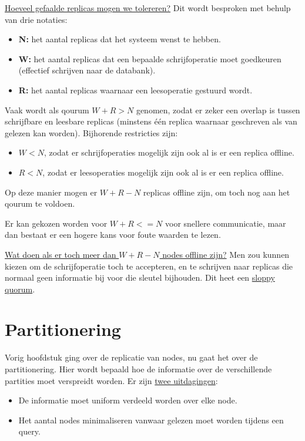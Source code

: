 	\underline{Hoeveel gefaalde replicas mogen we tolereren?} Dit wordt besproken met behulp van drie notaties:
	\begin{itemize}
		\item[\info] \textbf{N:} het aantal replicas dat het systeem wenst te hebben.
		\item[\info] \textbf{W:} het aantal replicas dat een bepaalde schrijfoperatie moet goedkeuren (effectief schrijven naar de databank).
		\item[\info] \textbf{R:} het aantal replicas waarnaar een leesoperatie gestuurd wordt.
	\end{itemize}

	Vaak wordt als qourum $W + R > N$ genomen, zodat er zeker een overlap is tussen schrijfbare en leesbare replicas (minstens één replica waarnaar geschreven als van gelezen kan worden). Bijhorende restricties zijn:
	\begin{itemize}
		\item[\info] $W < N$, zodat er schrijfoperaties mogelijk zijn ook al is er een replica offline.
		\item[\info] $R < N$, zodat er leesoperaties mogelijk zijn ook al is er een replica offline.
	\end{itemize}
	Op deze manier mogen er $W + R - N$ replicas offline zijn, om toch nog aan het qourum te voldoen.

	
	Er kan gekozen worden voor $W + R <= N$ voor snellere communicatie, maar dan bestaat er een hogere kans voor foute waarden te lezen. 

	\underline{Wat doen als er toch meer dan $W + R - N$ nodes offline zijn?} Men zou kunnen kiezen om de schrijfoperatie toch te accepteren, en te schrijven naar replicas die normaal geen informatie bij voor die sleutel bijhouden. Dit heet een \underline{sloppy quorum}.

	\chapter{Partitionering}
	Vorig hoofdstuk ging over de replicatie van nodes, nu gaat het over de partitionering. Hier wordt bepaald hoe de informatie over de verschillende partities moet verspreidt worden. Er zijn \underline{twee uitdagingen}:
	\begin{itemize}
		\item[\info] De informatie moet uniform verdeeld worden over elke node.
		\item[\info] Het aantal nodes minimaliseren vanwaar gelezen moet worden tijdens een query.
	\end{itemize}
	
